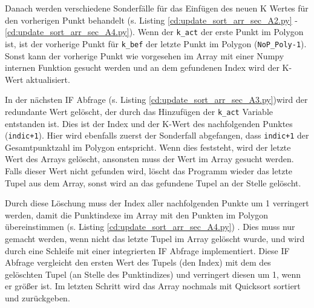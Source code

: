 {	\ifimportant
	
	\fi

	Danach werden verschiedene Sonderfälle für das Einfügen des neuen K Wertes für den vorherigen Punkt behandelt \ifimportant (s. Listing \ref{cd:update_sort_arr_sec_A2.py} - \ref{cd:update_sort_arr_sec_A4.py})\fi. Wenn der \lstinline|k_act| der erste Punkt im Polygon ist, ist der vorherige Punkt für \lstinline|k_bef| der letzte Punkt im Polygon (\lstinline|NoP_Poly-1|). Sonst kann der vorherige Punkt wie vorgesehen im Array mit einer Numpy internen Funktion gesucht werden und an dem gefundenen Index wird der K-Wert aktualisiert. \\

	\ifimportant
	
	\fi

	In der nächsten IF Abfrage \ifimportant (s. Listing \ref{cd:update_sort_arr_sec_A3.py})\fi  wird der redundante Wert gelöscht, der durch das Hinzufügen der \lstinline|k_act| Variable entstanden ist. Dies ist der Index und der K-Wert des nachfolgenden Punktes (\lstinline|indic+1|). Hier wird ebenfalls zuerst der Sonderfall abgefangen, dass \lstinline|indic+1| der Gesamtpunktzahl im Polygon entspricht. Wenn dies feststeht, wird der letzte Wert des Arrays gelöscht, ansonsten muss der Wert im Array gesucht werden. Falls dieser Wert nicht gefunden wird, löscht das Programm wieder das letzte Tupel aus dem Array, sonst wird an das gefundene Tupel an der Stelle gelöscht.
	
	\ifimportant
	
	\fi

	Durch diese Löschung muss der Index aller nachfolgenden Punkte um 1 verringert werden, damit die Punktindexe im Array mit den Punkten im Polygon übereinstimmen \ifimportant (s. Listing \ref{cd:update_sort_arr_sec_A4.py}) \fi. Dies muss nur gemacht werden, wenn nicht das letzte Tupel im Array gelöscht wurde, und wird durch eine Schleife mit einer integrierten IF Abfrage implementiert. Diese IF Abfrage vergleicht den ersten Wert des Tupels (den Index) mit dem des gelöschten Tupel (an Stelle des Punktindizes) und verringert diesen um 1, wenn er größer ist.
	Im letzten Schritt wird das Array nochmals mit Quicksort sortiert und zurückgeben.
	
}


